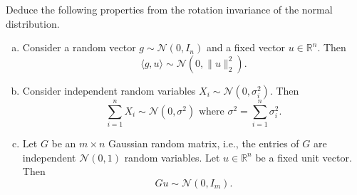 \begin{problem*}[Exercise 3.3.3]\label{ex3.3.3}
	Deduce the following properties from the rotation invariance of the normal distribution.
	\begin{enumerate}[(a)]
		\item\label{ex3.3.3:a} Consider a random vector \(g \sim \mathcal{N} (0, I_n)\) and a fixed vector \(u \in \mathbb{R} ^n\). Then
		      \[
			      \langle g, u \rangle
			      \sim \mathcal{N} (0, \lVert u \rVert _2^2).
		      \]
		\item\label{ex3.3.3:b} Consider independent random variables \(X_i \sim \mathcal{N} (0, \sigma _i^2)\). Then
		      \[
			      \sum_{i=1}^{n} X_i \sim \mathcal{N} (0, \sigma ^2)
			      \text{ where } \sigma ^2 = \sum_{i=1}^{n} \sigma _i^2.
		      \]
		\item\label{ex3.3.3:c} Let \(G\) be an \(m \times n\) Gaussian random matrix, i.e., the entries of \(G\) are independent \(\mathcal{N} (0, 1)\) random variables. Let \(u \in \mathbb{R} ^n\) be a fixed unit vector. Then
		      \[
			      Gu
			      \sim \mathcal{N} (0, I_m).
		      \]
	\end{enumerate}
\end{problem*}
